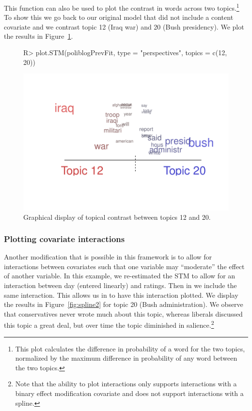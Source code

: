 \documentclass[article,shortnames]{jss}
\begin{document}
This function can also be used to plot the contrast in words across two topics.\footnote{This plot calculates the difference in probability of a word for the two topics, normalized by the maximum difference in probability of any word between the two topics.} To show this we go back to our original model that did not include a content covariate and we contrast topic 12 (Iraq war) and 20 (Bush presidency). We plot the results in Figure~\ref{fig:perp2}.

\begin{figure}
\begin{center}
\begin{Schunk}
\begin{Sinput}
R> plot.STM(poliblogPrevFit, type = "perspectives", topics = c(12, 20))
\end{Sinput}
\end{Schunk}
\includegraphics{stmVignette-021}
\caption{Graphical display of topical contrast between topics 12 and 20.}
\label{fig:perp2}
\end{center}
\end{figure}

\FloatBarrier

\subsubsection{Plotting covariate interactions}

Another modification that is possible in this framework is to allow for interactions between covariates such that one variable may ``moderate'' the effect of another variable. In this example, we re-estimated the STM to allow for an interaction between day (entered linearly) and ratings. Then in  we include the same interaction. This allows us in  to have this interaction plotted. We display the results in Figure~\ref{fig:spline2} for topic 20 (Bush administration). We observe that conservatives never wrote much about this topic, whereas liberals discussed this topic a great deal, but over time the topic diminished in salience.\footnote{Note that the ability to plot interactions only supports interactions with a binary effect modification covariate and does not support interactions with a spline.}
\end{document}

